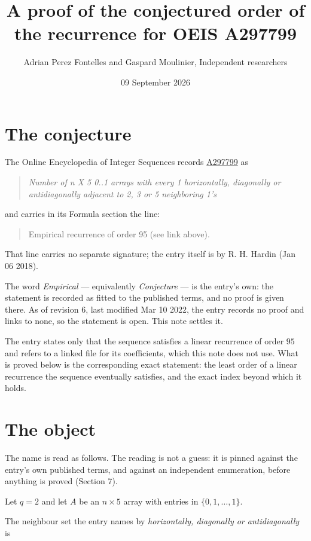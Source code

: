 \documentclass[11pt]{article}
\title{A proof of the conjectured order of the recurrence for OEIS A297799}
\author{Adrian Perez Fontelles and Gaspard Moulinier, Independent researchers}
\date{09 September 2026}
\theoremstyle{definition}
\begin{document}
\maketitle
\section{The conjecture}

The Online Encyclopedia of Integer Sequences records \href{https://oeis.org/A297799}{A297799} as

\begin{quote}\itshape Number of n X 5 0..1 arrays with every 1 horizontally, diagonally or antidiagonally adjacent to 2, 3 or 5 neighboring 1's\end{quote}

and carries in its Formula section the line:

\begin{quote}\ttfamily Empirical recurrence of order 95 (see link above).\end{quote}

That line carries no separate signature; the entry itself is by R. H. Hardin (Jan 06 2018).

The word {\itshape Empirical} --- equivalently {\itshape Conjecture} --- is the entry's own: the statement is recorded as fitted to the published terms, and no proof is given there. As of revision 6, last modified Mar 10 2022, the entry records no proof and links to none, so the statement is open. This note settles it.

The entry states only that the sequence satisfies a linear recurrence of order $95$ and refers to a linked file for its coefficients, which this note does not use. What is proved below is the corresponding exact statement: the least order of a linear recurrence the sequence eventually satisfies, and the exact index beyond which it holds.

\section{The object}

The name is read as follows. The reading is not a guess: it is pinned against the entry's own published terms, and against an independent enumeration, before anything is proved (Section 7).

Let $q = 2$ and let $A$ be an $n \times 5$ array with entries in $\{0,1,\dots,1\}$.

The neighbour set the entry names by {\itshape horizontally, diagonally or antidiagonally} is
\end{document}
